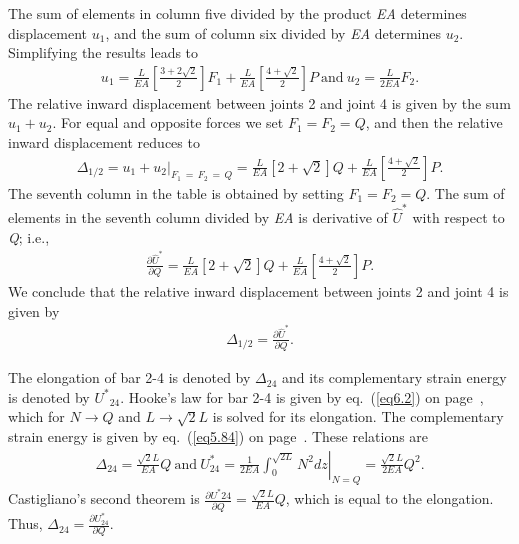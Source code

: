\documentclass{AeroStructure-ERJohnson}
\begin{document}
\begin{example}
\noindent The sum of elements in column five divided by the product \textit{EA} determines displacement $u_1$, and the sum of column six divided by \textit{EA} determines $u_2$. Simplifying the results leads to
\begin{align}
u_{1}=\frac{L}{E A}\left[\frac{3+2 \sqrt{2}}{2}\right] F_{1}+\frac{L}{E A}\left[\frac{4+\sqrt{2}}{2}\right] P\ \text{and}\ u_{2}=\frac{L}{2 E A} F_{2}.
\end{align}
The relative inward displacement between joints 2 and joint 4 is given by the sum $u_{1}+u_{2}$. For equal and opposite forces we set $F_{1}=F_{2}=Q$, and then the relative inward displacement reduces to
\begin{align}
\Delta_{1 / 2}=u_{1}+\left.u_{2}\right|_{F_{1}\,=\,F_{2}\,=\,Q}=\frac{L}{E A}[2+\sqrt{2}] Q+\frac{L}{E A}\left[\frac{4+\sqrt{2}}{2}\right] P.
\end{align}
The seventh column in the table is obtained by setting $F_{1}=F_{2}=Q$. The sum of elements in the seventh column divided by \textit{EA} is derivative of $\hat{U}^{*}$ with respect to \textit{Q}; i.e.,
\begin{align}
\frac{\partial \hat{U}^{*}}{\partial Q}=\frac{L}{E A}[2+\sqrt{2}] Q+\frac{L}{E A}\left[\frac{4+\sqrt{2}}{2}\right] P.
\end{align}
We conclude that the relative inward displacement between joints 2 and joint 4 is given by
\begin{align}
\Delta_{1 / 2}=\frac{\partial \hat{U}^*}{\partial Q}.
\end{align}

\vspace*{-1pc}

The elongation of bar 2-4 is denoted by $\Delta_{24}$ and its complementary strain energy is denoted by $U^{*}{ }_{24}$.
Hooke's law for bar 2-4 is given by eq.~(\ref{eq6.2}) on page~\pageref{eq6.2}, which for $N \rightarrow Q$ and $L \rightarrow \sqrt{2} L$ is solved for its elongation. The complementary strain energy is given by eq.~(\ref{eq5.84}) on page~\pageref{eq5.84}. These relations are
\begin{align}
\Delta_{24}=\frac{\sqrt{2} L}{E A} Q\ \text{and}\ U_{24}^{*}=\left.\frac{1}{2 E A} \int_{0}^{\sqrt{2 L}} N^{2} d z\right|_{N=Q}=\frac{\sqrt{2} L}{2 E A} Q^{2}.
\end{align}
Castigliano's second theorem is $\frac{\partial U^{*} 24}{\partial Q}=\frac{\sqrt{2} L}{E A} Q$, which is equal to the elongation. Thus, $\Delta_{24}=\frac{\partial U_{24}^{*}}{\partial Q}$.


\end{example}
\end{document}
